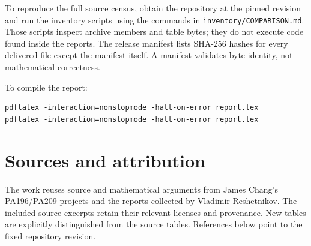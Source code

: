 \documentclass[11pt,a4paper]{article}
\newcommand{\file}[1]{\texttt{\nolinkurl{#1}}}
\begin{document}
To reproduce the full source census, obtain the repository at the
pinned revision and run the inventory scripts using the commands in
\file{inventory/COMPARISON.md}. Those scripts inspect archive members
and table bytes; they do not execute code found inside the reports.
The release manifest lists SHA-256 hashes for every delivered file
except the manifest itself. A manifest validates byte identity,
not mathematical correctness.

To compile the report:
\begin{verbatim}
pdflatex -interaction=nonstopmode -halt-on-error report.tex
pdflatex -interaction=nonstopmode -halt-on-error report.tex
\end{verbatim}

\section{Sources and attribution}\label{sec:sources}

The work reuses source and mathematical arguments from James Chang's
PA196/PA209 projects and the reports collected by Vladimir Reshetnikov.
The included source excerpts retain their relevant licenses and
provenance. New tables are explicitly distinguished from the source
tables. References below point to the fixed repository revision.
\end{document}
